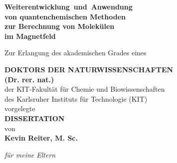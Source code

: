 \begin{titlepage}
    \begin{center}
      \begin{onehalfspace}          
        \mbox{\textbf{\huge{Weiterentwicklung und Anwendung}}}\\
        \vspace{0.4cm}
        \textbf{\huge{von quantenchemischen Methoden}}\\
        \vspace{0.4cm}
        \textbf{\huge{zur Berechnung von Molekülen}}\\ 
        \vspace{0.4cm}
        \textbf{\huge{im Magnetfeld}}
      \end{onehalfspace} 
        
        \vspace{1.5cm}
        Zur Erlangung des akademischen Grades eines
        
        \vspace{1.0cm}
        \textbf{\Large{DOKTORS DER NATURWISSENSCHAFTEN}}\\
        \vspace{1.cm}
        \textbf{\large{(Dr. rer. nat.)}}\\
        \vspace{1.5cm}
        der KIT-Fakultät für Chemie und Biowissenschaften\\
        \vspace{0.5cm}
        des Karlsruher Instituts für Technologie (KIT)\\
        \vspace{0.5cm}
        vorgelegte \\
        \vspace{1.0cm}
        \textbf{\Large{DISSERTATION}}\\
        \vspace{1.0cm}
        von\\
        \vspace{1.0cm}
        \textbf{\large{Kevin Reiter, M. Sc.}}\\
        
        \vfill        
    \end{center}
    
\newpage
\restoregeometry
\thispagestyle{empty}
\cleardoublepage

\newpage
\thispagestyle{empty}

\vspace*{\fill}
\begin{center}
\textit{für meine Eltern}
\end{center}
\vfill

\newpage
\thispagestyle{empty}
\cleardoublepage
\end{titlepage}